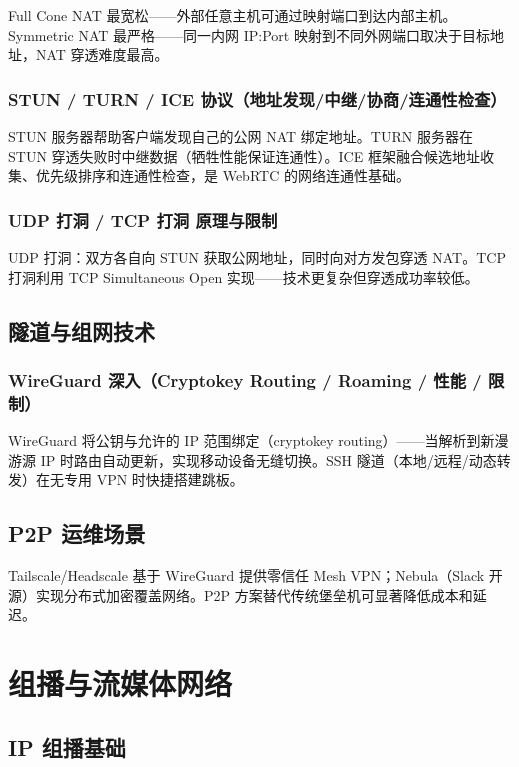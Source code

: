 \documentclass[12pt,UTF8]{ctexbook}
\begin{document}
Full Cone NAT 最宽松——外部任意主机可通过映射端口到达内部主机。Symmetric NAT 最严格——同一内网 IP:Port 映射到不同外网端口取决于目标地址，NAT 穿透难度最高。

    \subsection{STUN / TURN / ICE 协议（地址发现/中继/协商/连通性检查）}

STUN 服务器帮助客户端发现自己的公网 NAT 绑定地址。TURN 服务器在 STUN 穿透失败时中继数据（牺牲性能保证连通性）。ICE 框架融合候选地址收集、优先级排序和连通性检查，是 WebRTC 的网络连通性基础。

    \subsection{UDP 打洞 / TCP 打洞 原理与限制}

UDP 打洞：双方各自向 STUN 获取公网地址，同时向对方发包穿透 NAT。TCP 打洞利用 TCP Simultaneous Open 实现——技术更复杂但穿透成功率较低。

  \section{隧道与组网技术}
    \subsection{WireGuard 深入（Cryptokey Routing / Roaming / 性能 / 限制）}

WireGuard 将公钥与允许的 IP 范围绑定（cryptokey routing）——当解析到新漫游源 IP 时路由自动更新，实现移动设备无缝切换。SSH 隧道（本地/远程/动态转发）在无专用 VPN 时快捷搭建跳板。

  \section{P2P 运维场景}

Tailscale/Headscale 基于 WireGuard 提供零信任 Mesh VPN；Nebula（Slack 开源）实现分布式加密覆盖网络。P2P 方案替代传统堡垒机可显著降低成本和延迟。


\chapter{组播与流媒体网络}
\label{chap:multicast-streaming}

  \section{IP 组播基础}
\end{document}

